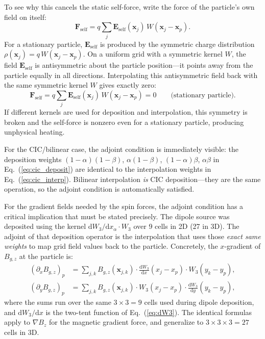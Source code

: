 \documentclass[11pt,a4paper]{article}
\newcommand{\vv}[1]{\mathbf{#1}}
\newcommand{\dd}{\mathrm{d}}
\begin{document}
To see why this cancels the static self-force, write the force of the particle's own field on itself:
\begin{equation}
  \vv{F}_{\mathrm{self}} = q\sum_j \vv{E}_{\mathrm{self}}(\vv{x}_j)\,W(\vv{x}_j-\vv{x}_p).
\end{equation}
For a stationary particle, $\vv{E}_{\mathrm{self}}$ is produced by the symmetric charge distribution $\rho(\vv{x}_j) = q\,W(\vv{x}_j-\vv{x}_p)$.  On a uniform grid with a symmetric kernel $W$, the field $\vv{E}_{\mathrm{self}}$ is antisymmetric about the particle position---it points away from the particle equally in all directions.  Interpolating this antisymmetric field back with the same symmetric kernel $W$ gives exactly zero:
\begin{equation}
  \vv{F}_{\mathrm{self}} = q\sum_j \vv{E}_{\mathrm{self}}(\vv{x}_j)\,W(\vv{x}_j-\vv{x}_p) = 0 \qquad \text{(stationary particle).}
\end{equation}
If different kernels are used for deposition and interpolation, this symmetry is broken and the self-force is nonzero even for a stationary particle, producing unphysical heating.

For the CIC/bilinear case, the adjoint condition is immediately visible: the deposition weights $(1-\alpha)(1-\beta)$, $\alpha(1-\beta)$, $(1-\alpha)\beta$, $\alpha\beta$ in Eq.~(\ref{eq:cic_deposit}) are identical to the interpolation weights in Eq.~(\ref{eq:cic_interp}).  Bilinear interpolation \emph{is} CIC deposition---they are the same operation, so the adjoint condition is automatically satisfied.

For the gradient fields needed by the spin forces, the adjoint condition has a critical implication that must be stated precisely.  The dipole source was deposited using the kernel $\dd W_3/\dd x_\alpha \cdot W_3$ over 9 cells in 2D (27 in 3D).  The adjoint of that deposition operator is the interpolation that uses those \emph{exact same weights} to map grid field values back to the particle.  Concretely, the $x$-gradient of $B_{g,z}$ at the particle is:
\begin{align}
  (\partial_x B_{g,z})_p &= \sum_{j,k} B_{g,z}(\vv{x}_{j,k})\cdot
    \frac{\dd W_3}{\dd x}(x_j - x_p)\cdot W_3(y_k - y_p), \label{eq:grad_adjoint_x}\\
  (\partial_y B_{g,z})_p &= \sum_{j,k} B_{g,z}(\vv{x}_{j,k})\cdot
    W_3(x_j - x_p)\cdot\frac{\dd W_3}{\dd y}(y_k - y_p), \label{eq:grad_adjoint_y}
\end{align}
where the sums run over the same $3\times 3 = 9$ cells used during dipole deposition, and $\dd W_3/\dd x$ is the two-tent function of Eq.~(\ref{eq:dW3}).  The identical formulas apply to $\nabla B_z$ for the magnetic gradient force, and generalize to $3\times 3\times 3 = 27$ cells in 3D.
\end{document}
